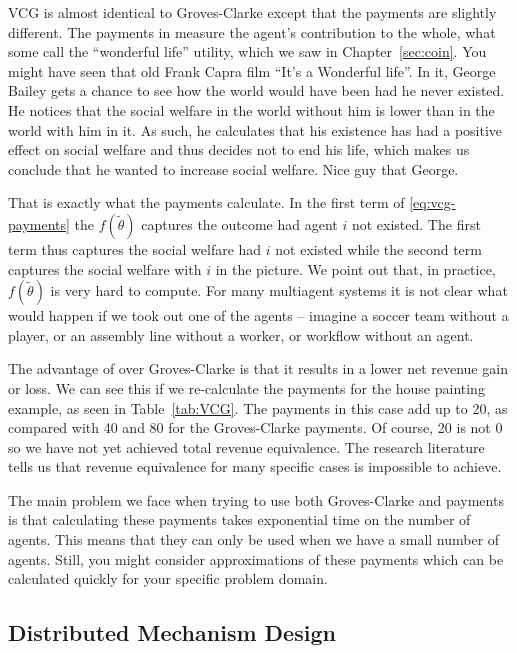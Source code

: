 VCG is almost identical to Groves-Clarke except that the payments are
slightly different. The payments in  measure the agent's
contribution to the whole, what some call the ``wonderful life''
utility, which we saw in Chapter~\ref{sec:coin}. You might have seen
that old Frank Capra film ``It's a Wonderful life''. In it, George
Bailey gets a chance to see how the world would have been had he never
existed. He notices that the social welfare in the world without him
is lower than in the world with him in it. As such, he calculates that
his existence has had a positive effect on social welfare and thus
decides not to end his life, which makes us conclude that he wanted to
increase social welfare. Nice guy that George.

That is exactly what the  payments calculate. In the first
term of \eqref{eq:vcg-payments} the $f(\tilde{\theta})$ captures the
outcome had agent $i$ not existed. The first term thus captures the
social welfare had $i$ not existed while the second term captures the
social welfare with $i$ in the picture. We point out that, in
practice, $f(\tilde{\theta})$ is very hard to compute. For many
multiagent systems it is not clear what would happen if we took out
one of the agents -- imagine a soccer team without a player, or an
assembly line without a worker, or workflow without an agent. 

The advantage of  over Groves-Clarke is that it results in a
lower net revenue gain or loss. We can see this if we re-calculate the
payments for the house painting example, as seen in
Table~\ref{tab:VCG}. The payments in this case add up to 20, as
compared with 40 and 80 for the Groves-Clarke payments. Of course, 20
is not 0 so we have not yet achieved total revenue equivalence.  The
research literature tells us that revenue equivalence for many
specific cases is impossible to achieve. 

The main problem we face when trying to use both Groves-Clarke and
 payments is that calculating these payments takes
exponential time on the number of agents. This means that they can
only be used when we have a small number of agents. Still, you might
consider approximations of these payments which can be calculated
quickly for your specific problem domain.

\subsection{Distributed Mechanism Design}
\label{sec:dmd}


